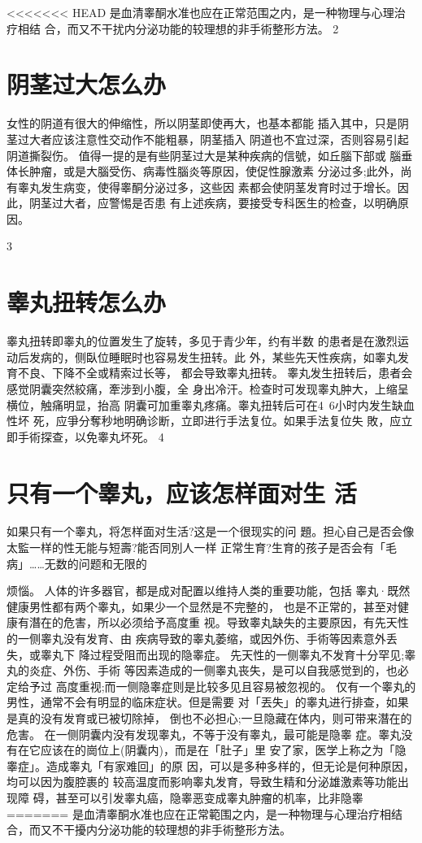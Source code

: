 \documentclass[12pt,UTF8]{ctexbook}
\begin{document}
<<<<<<< HEAD
是血清睾酮水准也应在正常范围之内，是一种物理与心理治疗相结
合，而又不干扰内分泌功能的较理想的非手術整形方法。
2
\section{阴茎过大怎么办}
女性的阴道有很大的伸缩性，所以阴茎即使再大，也基本都能
插入其中，只是阴茎过大者应该注意性交动作不能粗暴，阴茎插入
阴道也不宜过深，否则容易引起阴道撕裂伤。
值得一提的是有些阴茎过大是某种疾病的信號，如丘腦下部或
腦垂体长肿瘤，或是大腦受伤、病毒性腦炎等原因，使促性腺激素
分泌过多;此外，尚有睾丸发生病变，使得睾酮分泌过多，这些因
素都会使阴茎发育时过于增长。因此，阴茎过大者，应警惕是否患
有上述疾病，要接受专科医生的检查，以明确原因。

3
\section{睾丸扭转怎么办}
睾丸扭转即睾丸的位置发生了旋转，多见于青少年，约有半数
的患者是在激烈运动后发病的，侧臥位睡眠时也容易发生扭转。此
外，某些先天性疾病，如睾丸发育不良、下降不全或精索过长等，
都会导致睾丸扭转。
睾丸发生扭转后，患者会感觉阴囊突然絞痛，牽涉到小腹，全
身出冷汗。检查时可发现睾丸肿大，上缩呈横位，触痛明显，抬高
阴囊可加重睾丸疼痛。睾丸扭转后可在4~6小时内发生缺血性坏
死，应爭分奪秒地明确诊断，立即进行手法复位。如果手法复位失
敗，应立即手術探查，以免睾丸坏死。
4
\section{只有一个睾丸，应该怎样面对生
活}
如果只有一个睾丸，将怎样面对生活?这是一个很现实的问
題。担心自己是否会像太監一样的性无能与短壽?能否同別人一样
正常生育?生育的孩子是否会有「毛病」……无数的问题和无限的

烦惱。
人体的许多器官，都是成对配置以维持人类的重要功能，包括
睾丸·既然健康男性都有两个睾丸，如果少一个显然是不完整的，
也是不正常的，甚至对健康有潛在的危害，所以必须给予高度重
视。导致睾丸缺失的主要原因，有先天性的一侧睾丸没有发育、由
疾病导致的睾丸萎缩，或因外伤、手術等因素意外丢失，或睾丸下
降过程受阻而出现的隐睾症。
先天性的一侧睾丸不发育十分罕见;睾丸的炎症、外伤、手術
等因素造成的一侧睾丸丧失，是可以自我感觉到的，也必定给予过
高度重视;而一侧隐睾症则是比较多见且容易被忽视的。
仅有一个睾丸的男性，通常不会有明显的临床症状。但是需要
对「丟失」的睾丸进行排查，如果是真的没有发育或已被切除掉，
倒也不必担心;一旦隐藏在体内，则可带来潛在的危害。
在一侧阴囊内没有发现睾丸，不等于没有睾丸，最可能是隐睾
症。睾丸没有在它应该在的崗位上(阴囊内)，而是在「肚子」里
安了家，医学上称之为「隐睾症」。造成睾丸「有家难回」的原
因，可以是多种多样的，但无论是何种原因，均可以因为腹腔裹的
较高温度而影响睾丸发育，导致生精和分泌雄激素等功能出现障
碍，甚至可以引发睾丸癌，隐睾恶变成睾丸肿瘤的机率，比非隐睾
=======
是血清睾酮水准也应在正常範围之内，是一种物理与心理治疗相结
合，而又不干擾内分泌功能的较理想的非手術整形方法。
\end{document}
